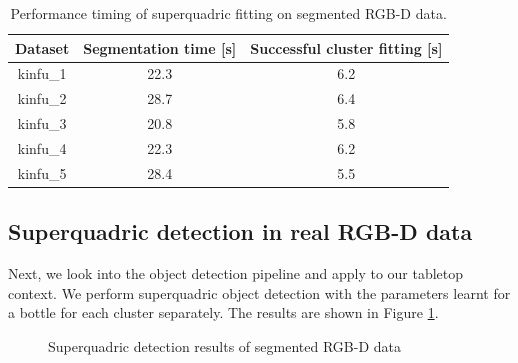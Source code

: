 \documentclass{article}
\begin{document}
\begin{table}
\centering
\begin{tabular}{| c | c | c |}
\hline
Dataset & Segmentation time [s] & Successful cluster fitting [s] \\
\hline
kinfu\_1 & 22.3 & 6.2 \\
kinfu\_2 & 28.7 & 6.4 \\
kinfu\_3 & 20.8 & 5.8 \\
kinfu\_4 & 22.3 & 6.2 \\
kinfu\_5 & 28.4 & 5.5 \\
\hline
\end{tabular}

\caption {Performance timing of superquadric fitting on segmented RGB-D data.}
\label {table:rgbd_fitting_timing}
\end{table}


\subsection*{Superquadric detection in real RGB-D data}

Next, we look into the object detection pipeline and apply to our tabletop context. We perform superquadric object detection with the parameters learnt for a bottle for each cluster separately. The results are shown in Figure \ref{fig:rgbd_detection}.

\begin{figure}
\centering

\caption{Superquadric detection results of segmented RGB-D data}
\label{fig:rgbd_detection}
\end{figure}
\end{document}
